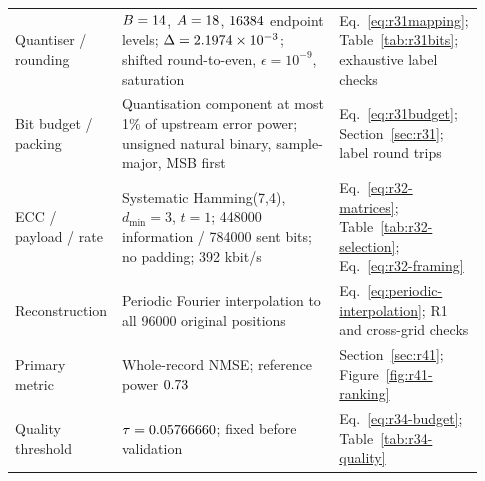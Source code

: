 \begin{longtable}{p{0.22\linewidth}p{0.46\linewidth}p{0.25\linewidth}}
Quantiser / rounding & $B=14$, $A=18$, $16384$ endpoint
 levels; $\Delta=2.1974\times10^{-3}$; shifted round-to-even, $\epsilon=10^{-9}$,
 saturation
 & Eq.~\eqref{eq:r31mapping}; Table~\ref{tab:r31bits}; exhaustive label checks\\
Bit budget / packing & Quantisation component at most 1\% of upstream
 error power; unsigned natural binary, sample-major, MSB first
 & Eq.~\eqref{eq:r31budget}; Section~\ref{sec:r31}; label round trips\\
ECC / payload / rate & Systematic Hamming(7,4), $d_{\min}=3$, $t=1$;
 448000 information / 784000 sent bits; no padding; 392 kbit/s
 & Eq.~\eqref{eq:r32-matrices}; Table~\ref{tab:r32-selection}; Eq.~\eqref{eq:r32-framing}\\
Reconstruction & Periodic Fourier interpolation to all 96000 original
 positions
 & Eq.~\eqref{eq:periodic-interpolation}; R1 and cross-grid checks\\
Primary metric & Whole-record NMSE; reference power $0.73$
 & Section~\ref{sec:r41}; Figure~\ref{fig:r41-ranking}\\
Quality threshold & $\tau=0.05766660$; fixed before validation
 & Eq.~\eqref{eq:r34-budget}; Table~\ref{tab:r34-quality}\\
\end{longtable}
\endgroup
\FloatBarrier
